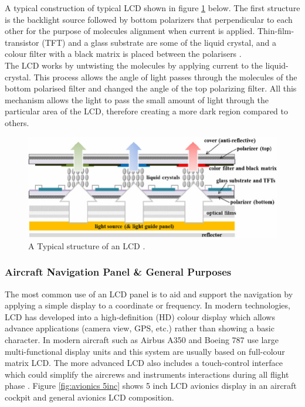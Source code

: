 \noindent A typical construction of typical LCD shown in figure \ref{fig:LCD structure} below. The first structure is the backlight source followed by bottom polarizers that perpendicular to each other for the purpose of molecules alignment when current is applied. Thin-film-transistor (TFT) and a glass substrate are some of the liquid crystal, and a colour filter with a black matrix is placed between the polarisers \cite{AnonymousLCDApplications}. \\ 

\noindent The LCD works by untwisting the molecules by applying current to the liquid-crystal. This process allows the angle of light passes through the molecules of the bottom polarised filter and changed the angle of the top polarizing filter. All this mechanism allows the light to pass the small amount of light through the particular area of the LCD, therefore creating a more dark region compared to others.

\begin{figure}[!ht]
    \centering
    \includegraphics[scale=0.45]{Figures/LCD_Typical structure.png}
    \caption{A Typical structure of an LCD \cite{Park2013EfficiencyPrograms}.}
    \label{fig:LCD structure}
\end{figure}

\subsubsection{Aircraft Navigation Panel \& General Purposes}
The most common use of an LCD panel is to aid and support the navigation by applying a simple display to a coordinate or frequency. In modern technologies, LCD has developed into a  high-definition (HD) colour display which allows advance applications (camera view, GPS, etc.)  rather than showing a basic character. In modern aircraft such as Airbus A350 and Boeing 787 use large multi-functional display units \cite{AnonymousTouchAirbus} and this system are usually based on full-colour matrix LCD.  The more advanced LCD also includes a touch-control interface which could simplify the aircrews and instruments interactions during all flight phase \cite{AnonymousTouchAirbus}. Figure \ref{fig:avionics 5inc} shows 5 inch LCD avionics display in an aircraft cockpit and general avionics LCD composition.\\


